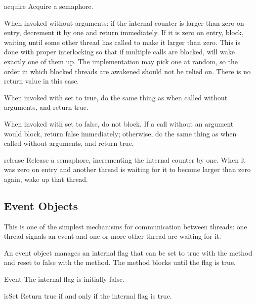\begin{methoddesc}{acquire}{}
Acquire a semaphore.

When invoked without arguments: if the internal counter is larger than
zero on entry, decrement it by one and return immediately.  If it is
zero on entry, block, waiting until some other thread has called
 to make it larger than zero.  This is done with
proper interlocking so that if multiple  calls are
blocked,  will wake exactly one of them up.  The
implementation may pick one at random, so the order in which blocked
threads are awakened should not be relied on.  There is no return
value in this case.

When invoked with  set to true, do the same thing as
when called without arguments, and return true.

When invoked with  set to false, do not block.  If a
call without an argument would block, return false immediately;
otherwise, do the same thing as when called without arguments, and
return true.
\end{methoddesc}

\begin{methoddesc}{release}{}
Release a semaphore,
incrementing the internal counter by one.  When it was zero on
entry and another thread is waiting for it to become larger
than zero again, wake up that thread.
\end{methoddesc}


\subsection{Event Objects \label{event-objects}}

This is one of the simplest mechanisms for communication between
threads: one thread signals an event and one or more other thread
are waiting for it.

An event object manages an internal flag that can be set to true with
the  method and reset to false with the  method.  The
 method blocks until the flag is true.


\begin{classdesc}{Event}{}
The internal flag is initially false.
\end{classdesc}

\begin{methoddesc}{isSet}{}
Return true if and only if the internal flag is true.
\end{methoddesc}

